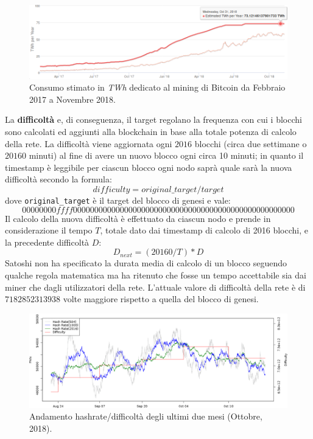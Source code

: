 \begin{figure}
    \includegraphics[width=\textwidth]{images/bitcoin_watt.png}
    \caption{Consumo stimato in \textit{TWh} dedicato al mining di Bitcoin da Febbraio 2017 a Novembre 2018.}
\end{figure}
La \textbf{difficoltà} e, di conseguenza, il target regolano la frequenza con cui i blocchi sono calcolati ed aggiunti alla blockchain in base alla totale potenza di calcolo della rete. La difficoltà viene aggiornata ogni $2016$ blocchi (circa due settimane o $20160$ minuti) al fine di avere un nuovo blocco ogni circa 10 minuti; in quanto il timestamp è leggibile per ciascun blocco ogni nodo saprà quale sarà la nuova difficoltà secondo la formula:
\begin{equation}
     difficulty = original\_target / target
\end{equation}
dove \texttt{original\_target} è il target del blocco di genesi e vale:
\begin{equation}
    00000000ffff0000000000000000000000000000000000000000000000000000
\end{equation}
Il calcolo della nuova difficoltà è effettuato da ciascun nodo e prende in considerazione il tempo $T$, totale dato dai timestamp di calcolo di 2016 blocchi, e la precedente difficoltà $D$:
\begin{equation}
    D_{next} = (20160 / T) * D
\end{equation}
Satoshi non ha specificato la durata media di calcolo di un blocco seguendo qualche regola matematica ma ha ritenuto che fosse un tempo accettabile sia dai miner che dagli utilizzatori della rete.\newline
L'attuale valore di difficoltà della rete è di $7182852313938$ volte maggiore rispetto a quella del blocco di genesi.
\begin{figure}[H]
    \centering
    \includegraphics[width=\textwidth]{images/diffvshash.png}
    \caption{Andamento hashrate/difficoltà degli ultimi due mesi (Ottobre, 2018).}
\end{figure}
